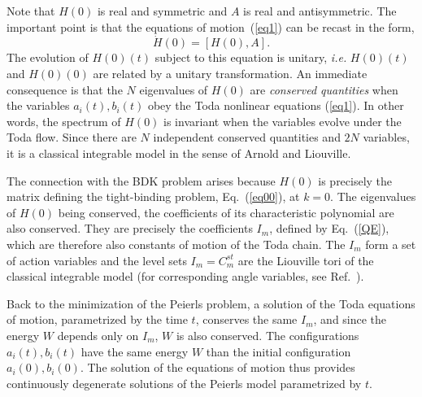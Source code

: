 \documentclass[]{revtex4-1}
\begin{document}
Note that $H(0)$ is real and symmetric and $A$ is real and antisymmetric. 
The important point is that the equations of motion~(\ref{eq1}) can be recast in the form,
\begin{equation}
\dot{H}(0)=[H(0),A].
\end{equation}
The evolution of $H(0)(t)$ subject to this equation is unitary, \textit{i.e.} $H(0)(t)$ and $H(0)(0)$ are related by a unitary transformation.
An immediate consequence is that the $N$ eigenvalues of $H(0)$ are \textit{conserved quantities} when the variables $a_i(t),b_i(t)$ obey the Toda nonlinear equations (\ref{eq1}). In other words, the spectrum of $H(0)$ is invariant when the variables evolve under the Toda flow. Since there are $N$ independent conserved quantities and $2N$ variables, it is a classical integrable model in the sense of Arnold and Liouville.

The connection with the BDK problem arises because $H(0)$ is precisely the matrix defining the tight-binding problem, Eq.~(\ref{eq00}), at $k=0$.
The eigenvalues of $H(0)$ being conserved, the coefficients of its characteristic polynomial are also conserved. They are precisely the coefficients $I_m$, defined
  by Eq.~(\ref{QE}), which are therefore also constants of motion of the Toda chain. The $I_m$ form a set of action variables and the level sets $I_m=C^{st}_m$ are the Liouville tori of the classical integrable model (for corresponding angle variables, see Ref.~\cite{Todabook}).

Back to the minimization of the Peierls problem, a solution of the Toda equations of motion, parametrized by the time $t$, conserves the same $I_m$, and since the energy $W$ depends only on $I_m$,  $W$ is also conserved. The configurations $a_i(t),b_i(t)$ have the same energy $W$ than the initial configuration $a_i(0),b_i(0)$. The solution of the equations of motion thus provides continuously degenerate solutions of the Peierls model parametrized by $t$.
\end{document}
